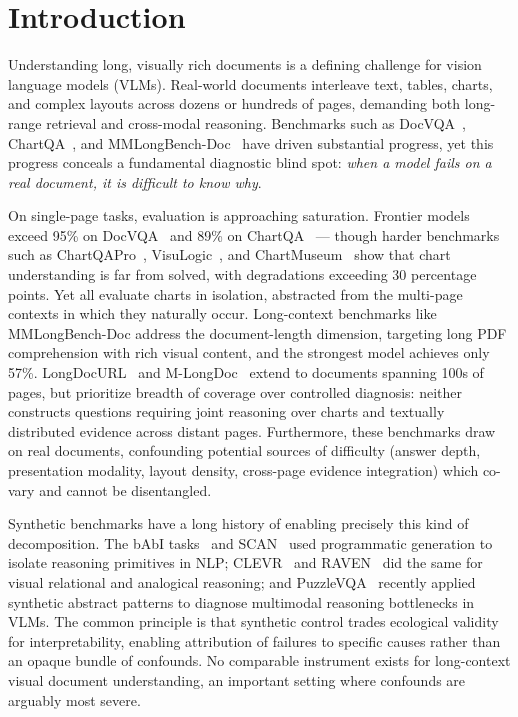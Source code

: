 \section{Introduction}

Understanding long, visually rich documents is a defining challenge for vision language models (VLMs). Real-world documents interleave text, tables, charts, and complex layouts across dozens or hundreds of pages, demanding both long-range retrieval and cross-modal reasoning. Benchmarks such as DocVQA~\citep{mathew2021docvqa}, ChartQA~\citep{masry2022chartqa}, and MMLongBench-Doc~\citep{ma2024mmlongbenchdoc} have driven substantial progress, yet this progress conceals a fundamental diagnostic blind spot: \emph{when a model fails on a real document, it is difficult to know why}.

On single-page tasks, evaluation is approaching saturation. Frontier models exceed 95\% on DocVQA~\citep{bai2025qwen3,wang2025internvl3} and 89\% on ChartQA~\citep{anthropic2024claude45sonnet,bai2025qwen3} --- though harder benchmarks such as ChartQAPro~\citep{masry2025chartqapro}, VisuLogic~\citep{zhang2025visulogic}, and ChartMuseum~\citep{xu2025chartmuseum} show that chart understanding is far from solved, with degradations exceeding 30 percentage points. Yet all evaluate charts in isolation, abstracted from the multi-page contexts in which they naturally occur. Long-context benchmarks like  MMLongBench-Doc \citep{ma2024mmlongbenchdoc} address the document-length dimension, targeting long PDF comprehension with rich visual content, and the strongest model achieves only 57\%. LongDocURL~\citep{deng2025longdocurl} and M-LongDoc~\citep{chia2024mlongdoc} extend to documents spanning 100s of pages, but prioritize breadth of coverage over controlled diagnosis: neither constructs questions requiring joint reasoning over charts and textually distributed evidence across distant pages. Furthermore, these benchmarks draw on real documents, confounding potential sources of difficulty (answer depth, presentation modality, layout density, cross-page evidence integration) which co-vary and cannot be disentangled.

Synthetic benchmarks have a long history of enabling precisely this kind of decomposition. The bAbI tasks~\citep{weston2015babi} and SCAN~\citep{lake2018scan} used programmatic generation to isolate reasoning primitives in NLP; CLEVR~\citep{johnson2017clevr} and RAVEN~\citep{zhang2019raven} did the same for visual relational and analogical reasoning; and PuzzleVQA~\citep{chia2024puzzlevqa} recently applied synthetic abstract patterns to diagnose multimodal reasoning bottlenecks in VLMs. The common principle is that synthetic control trades ecological validity for interpretability, enabling attribution of failures to specific causes rather than an opaque bundle of confounds. No comparable instrument exists for long-context visual document understanding, an important setting where confounds are arguably most severe.

